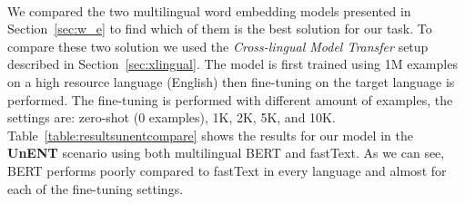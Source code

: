 \paragraph{}
We compared the two multilingual word embedding models presented in Section~\ref{sec:w_e} to find which of them is the best solution for our task. To compare these two solution we used the \textit{ Cross-lingual Model Transfer} setup described in Section~\ref{sec:xlingual}. The model is first trained using 1M examples on a high resource language (English) then fine-tuning on the target language is performed. The fine-tuning is performed with different amount of examples, the settings are: zero-shot (0 examples), 1K, 2K, 5K, and 10K. Table~\ref{table:resultsunentcompare} shows the results for our model in the \textbf{UnENT} scenario using both multilingual BERT and fastText. As we can see, BERT performs poorly compared to fastText in every language and almost for each of the fine-tuning settings. 

